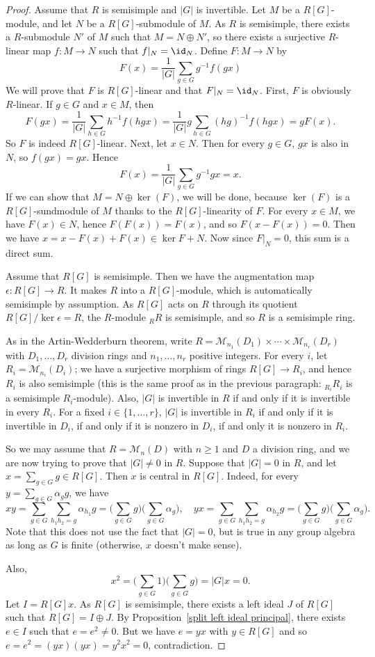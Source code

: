 \begin{proof}
Assume that $R$ is semisimple and $|G|$ is invertible. Let $M$ be a $R[G]$-module, and let $N$ be a $R[G]$-submodule of $M$. As $R$ is semisimple, there exists a $R$-submodule $N'$ of $M$ such that $M=N\oplus N'$, so there exists a surjective $R$-linear map $f:M\to N$ such that $f|_N=\id_N$. Define $F:M\to N$ by
\[F(x)=\frac{1}{|G|}\sum_{g\in G}g^{-1}f(gx)\]
We will prove that $F$ is $R[G]$-linear and that $F|_N=\id_N$. First, $F$ is obviously $R$-linear. If $g\in G$ and $x\in M$, then
\[F(gx)=\frac{1}{|G|}\sum_{h\in G}h^{-1}f(hgx)=\frac{1}{|G|}g\sum_{h\in G}(hg)^{-1}f(hgx)=gF(x).\]
So $F$ is indeed $R[G]$-linear. Next, let $x\in N$. Then for every $g\in G$, $gx$ is also in $N$, so $f(gx)=gx$. Hence
\[F(x)=\frac{1}{|G|}\sum_{g\in G}g^{-1}gx=x.\]
If we can show that $M=N\oplus\ker(F)$, we will be done, because $\ker(F)$ is a $R[G]$-sundmodule of $M$ thanks to the $R[G]$-linearity of $F$. For every $x\in M$, we have $F(x)\in N$, hence $F(F(x))=F(x)$, and so $F(x-F(x))=0$. Then we have $x=x-F(x)+F(x)\in\ker F+N$. Now since $F|_N=0$, this sum is a direct sum.\par
Assume that $R[G]$ is semisimple. Then we have the augmentation map $\epsilon:R[G]\to R$. It makes $R$ into a $R[G]$-module, which is automatically semisimple by assumption. As $R[G]$ acts on $R$ through its quotient $R[G]/\ker\epsilon=R$, the $R$-module $_{R}R$ is semisimple, and so $R$ is a semisimple ring.\par
As in the Artin-Wedderburn theorem, write $R=\mathcal{M}_{n_1}(D_1)\times\cdots\times\mathcal{M}_{n_r}(D_r)$ with $D_1,\dots,D_r$ division rings and $n_1,\dots,n_r$ positive integers. For every $i$, let $R_i=\mathcal{M}_{n_i}(D_i)$; we have a surjective morphism of rings $R[G]\to R_i$, and hence $R_i$ is also semisimple (this is the same proof as in the previous paragraph: $_{R_i}R_i$ is a semisimple $R_i$-module). Also, $|G|$ is invertible in $R$ if and only if it is invertible in every $R_i$. For a fixed $i\in\{1,\dots,r\}$, $|G|$ is invertible in $R_i$ if and only if it is invertible in $D_i$, if and only if it is nonzero in $D_i$, if and only it is nonzero in $R_i$.\par
So we may assume that $R=\mathcal{M}_n(D)$ with $n\geq1$ and $D$ a division ring, and we are now trying to prove that $|G|\neq0$ in $R$. Suppose that $|G|=0$ in $R$, and let $x=\sum_{g\in G}g\in R[G]$. Then $x$ is central in $R[G]$. Indeed, for every $y=\sum_{g\in G}\alpha_gg$, we have
\[xy=\sum_{g\in G}\sum_{h_1h_2=g}\alpha_{h_1}g=\Big(\sum_{g\in G}g\Big)\Big(\sum_{g\in G}\alpha_g\Big),\quad yx=\sum_{g\in G}\sum_{h_1h_2=g}\alpha_{h_2}g=\Big(\sum_{g\in G}g\Big)\Big(\sum_{g\in G}\alpha_g\Big).\]
Note that this does not use the fact that $|G|=0$, but is true in any group algebra as long as $G$ is finite (otherwise, $x$ doesn't make sense).\par
Also,
\[x^2=\Big(\sum_{g\in G}1\Big)\Big(\sum_{g\in G}g\Big)=|G|x=0.\]
Let $I=R[G]x$. As $R[G]$ is semisimple, there exists a left ideal $J$ of $R[G]$ such that $R[G]=I\oplus J$. By Proposition~\ref{split left ideal principal}, there exists $e\in I$ such that $e=e^2\neq 0$. But we have $e=yx$ with $y\in R[G]$ and so $e=e^2=(yx)(yx)=y^2x^2=0$, contradiction.
\end{proof}
